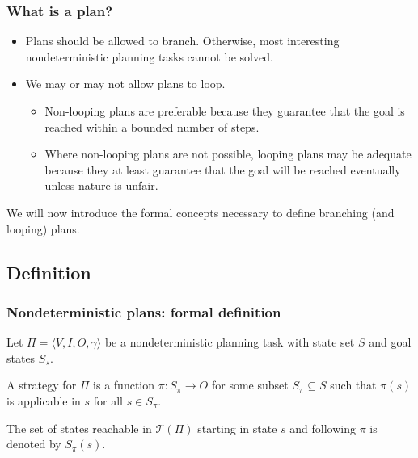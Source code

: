 \documentclass{gkibeamer}
\begin{document}
\begin{frame}
  \frametitle{What is a plan?}

  \begin{itemize}
  \item Plans should be allowed to \alert{branch}. Otherwise, most
    interesting nondeterministic planning tasks cannot be solved.
  \item We may or may not allow plans to \alert{loop}.
    \begin{itemize}
    \item Non-looping plans are preferable because they
      \alert{guarantee} that the goal is reached within a bounded
      number of steps.
    \item Where non-looping plans are not possible, looping plans
      may be adequate because they at least guarantee that the goal
      will be reached \alert{eventually} unless nature is
      \alert{unfair}.
    \end{itemize}
  \end{itemize}
  We will now introduce the formal concepts necessary to define
  branching (and looping) plans.
\end{frame}

\subsection{Definition}

\begin{frame}
  \frametitle{Nondeterministic plans: formal definition}

  \begin{definition}[strategy]
    Let $\Pi = \langle V, I, O, \gamma\rangle$ be a nondeterministic
    planning task with state set $S$ and goal states $S_\star$.

    \medskip

    A \alert{strategy} for $\Pi$ is a function $\pi: S_\pi \to O$ for
    some subset $S_\pi \subseteq S$ such that $\pi(s)$ is applicable in
    $s$ for all $s \in S_\pi$.

    \medskip

    The set of states reachable in $\mathcal T(\Pi)$ starting in state
    $s$ and following $\pi$ is denoted by $S_\pi(s)$.
  \end{definition}
\end{frame}
\end{document}
